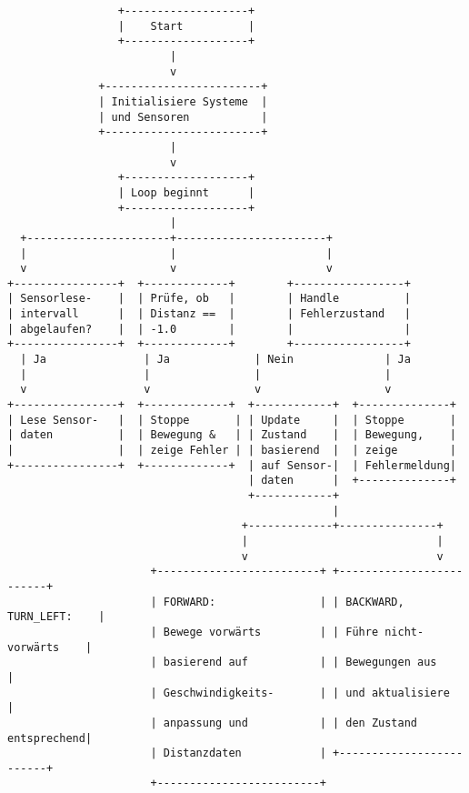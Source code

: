 \documentclass{vorlage-design-main}
\begin{document}
\begin{lstlisting}
                 +-------------------+
                 |    Start          |
                 +-------------------+
                         |
                         v
              +------------------------+
              | Initialisiere Systeme  |
              | und Sensoren           |
              +------------------------+
                         |
                         v
                 +-------------------+
                 | Loop beginnt      |
                 +-------------------+
                         |
  +----------------------+-----------------------+
  |                      |                       |
  v                      v                       v
+----------------+  +-------------+        +-----------------+
| Sensorlese-    |  | Prüfe, ob   |        | Handle          |
| intervall      |  | Distanz ==  |        | Fehlerzustand   |
| abgelaufen?    |  | -1.0        |        |                 |
+----------------+  +-------------+        +-----------------+
  | Ja               | Ja             | Nein              | Ja
  |                  |                |                   |
  v                  v                v                   v
+----------------+  +-------------+  +------------+  +--------------+
| Lese Sensor-   |  | Stoppe       | | Update     |  | Stoppe       |
| daten          |  | Bewegung &   | | Zustand    |  | Bewegung,    |
|                |  | zeige Fehler | | basierend  |  | zeige        |
+----------------+  +-------------+  | auf Sensor-|  | Fehlermeldung|
                                     | daten      |  +--------------+
                                     +------------+
                                                  |
                                    +-------------+---------------+
                                    |                             |
                                    v                             v
                      +-------------------------+ +-------------------------+
                      | FORWARD:                | | BACKWARD, TURN_LEFT:    |
                      | Bewege vorwärts         | | Führe nicht-vorwärts    |
                      | basierend auf           | | Bewegungen aus          |
                      | Geschwindigkeits-       | | und aktualisiere        |
                      | anpassung und           | | den Zustand entsprechend|
                      | Distanzdaten            | +-------------------------+
                      +-------------------------+
\end{lstlisting}
\end{document}
